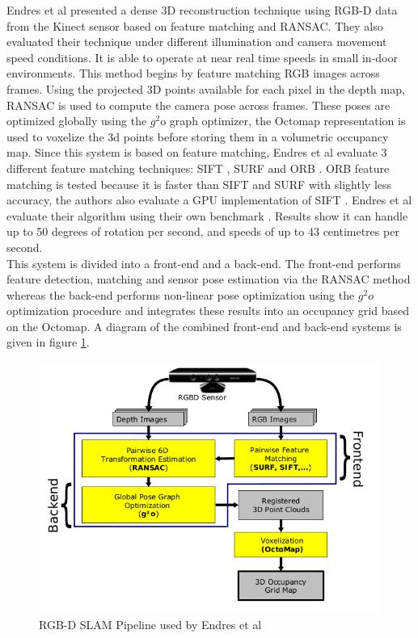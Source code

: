 Endres et al \cite{Endres12Evaluation} presented a dense 3D reconstruction technique using RGB-D data from the Kinect sensor based on feature matching and RANSAC. They also evaluated their technique under different illumination and camera movement speed conditions. It is able to operate at near real time speeds in small in-door environments. This method begins by feature matching RGB images across frames. Using the projected 3D points available for each pixel in the depth map, RANSAC \cite{Fischler81Random,Huttenlocher91Fast} is used to compute the camera pose across frames. These poses are optimized globally using the $g^2$o graph optimizer, the Octomap representation \cite{Wurm10Octomap} is used to voxelize the 3d points before storing them in a volumetric occupancy map. Since this system is based on feature matching, Endres et al evaluate 3 different feature matching techniques: SIFT \cite{Lowe04Distinctive} , SURF \cite{Bay06Surf,Bay08Speeded} and ORB \cite{Rublee11Orb}. ORB feature matching is tested because it is faster than SIFT and SURF with slightly less accuracy, the authors also evaluate a GPU implementation of SIFT \cite{Wu07Siftgpu}. Endres et al evaluate their algorithm using their own benchmark \cite{Sturm11Towards}. Results show it can handle up to 50 degrees of rotation per second, and speeds of up to 43 centimetres per second.  \\


This system is divided into a front-end and a back-end. The front-end performs feature detection, matching and sensor pose estimation via the RANSAC method whereas the back-end performs non-linear pose optimization using the $g^2o$ optimization procedure   and integrates these results into an occupancy grid based on the Octomap. A diagram of the combined front-end and back-end systems is given in figure \ref{Endres12EvaluationPipeline}. 


\begin{figure}[!h]
\centering
\includegraphics[width=12cm]{images/ch1/Endres12EvaluationPipeline}
\caption{RGB-D SLAM Pipeline used by Endres et al \cite{Endres12Evaluation}}
\label{Endres12EvaluationPipeline}
\end{figure}



